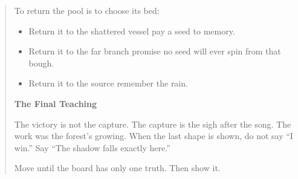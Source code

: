 \documentclass[11pt]{article}
\begin{document}
\begin{quote}
To return the pool is to choose its bed:
\begin{itemize}\itemsep0.2em
  \item Return it to the shattered vessel\; pay a seed to memory.
  \item Return it to the far branch\; promise no seed will ever spin from that bough.
  \item Return it to the source\; remember the rain.
\end{itemize}

\medskip
\textbf{The Final Teaching}

The victory is not the capture. The capture is the sigh after the song. The work was the forest’s growing. When the last shape is shown, do not say “I win.” Say\; “The shadow falls exactly here.”

Move until the board has only one truth. Then show it.
\end{quote}

\clearpage
\end{document}
